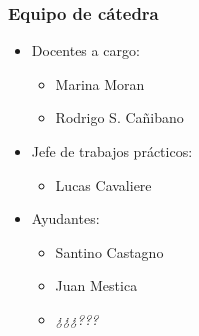 \documentclass[11pt,a4paper,spanish]{beamer}
\begin{document}
\begin{frame}

    \frametitle{Equipo de cátedra}

\begin{itemize}

\item Docentes a cargo:
    \begin{itemize}
        \item Marina Moran
        \item Rodrigo S. Cañibano
    \end{itemize}

\item Jefe de trabajos prácticos:
    \begin{itemize}
        \item Lucas Cavaliere
    \end{itemize}

\item Ayudantes:
    \begin{itemize}
        \item Santino Castagno
        \item Juan Mestica
        \item \emph{¿¿¿???}
    \end{itemize}
\end{itemize}

\end{frame}
\end{document}
